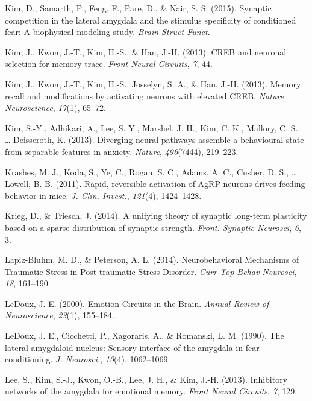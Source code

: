 \documentclass[12pt,a4paperpaper,]{report}
\begin{document}
\hypertarget{ref-kimux5fsynapticux5f2015}{}
Kim, D., Samarth, P., Feng, F., Pare, D., \& Nair, S. S. (2015).
Synaptic competition in the lateral amygdala and the stimulus
specificity of conditioned fear: A biophysical modeling study.
\emph{Brain Struct Funct}.

\hypertarget{ref-kimux5fcrebux5f2013}{}
Kim, J., Kwon, J.-T., Kim, H.-S., \& Han, J.-H. (2013). CREB and
neuronal selection for memory trace. \emph{Front Neural Circuits},
\emph{7}, 44.

\hypertarget{ref-kimux5fmemoryux5f2013}{}
Kim, J., Kwon, J.-T., Kim, H.-S., Josselyn, S. A., \& Han, J.-H. (2013).
Memory recall and modifications by activating neurons with elevated
CREB. \emph{Nature Neuroscience}, \emph{17}(1), 65--72.

\hypertarget{ref-kimux5fdivergingux5f2013-1}{}
Kim, S.-Y., Adhikari, A., Lee, S. Y., Marshel, J. H., Kim, C. K.,
Mallory, C. S., \ldots{} Deisseroth, K. (2013). Diverging neural
pathways assemble a behavioural state from separable features in
anxiety. \emph{Nature}, \emph{496}(7444), 219--223.

\hypertarget{ref-krashesux5frapidux5f2011}{}
Krashes, M. J., Koda, S., Ye, C., Rogan, S. C., Adams, A. C., Cusher, D.
S., \ldots{} Lowell, B. B. (2011). Rapid, reversible activation of AgRP
neurons drives feeding behavior in mice. \emph{J. Clin. Invest.},
\emph{121}(4), 1424--1428.

\hypertarget{ref-kriegux5funifyingux5f2014-1}{}
Krieg, D., \& Triesch, J. (2014). A unifying theory of synaptic
long-term plasticity based on a sparse distribution of synaptic
strength. \emph{Front. Synaptic Neurosci}, \emph{6}, 3.

\hypertarget{ref-lapiz-bluhmux5fneurobehavioralux5f2014}{}
Lapiz-Bluhm, M. D., \& Peterson, A. L. (2014). Neurobehavioral
Mechanisms of Traumatic Stress in Post-traumatic Stress Disorder.
\emph{Curr Top Behav Neurosci}, \emph{18}, 161--190.

\hypertarget{ref-ledouxux5femotionux5f2000-1}{}
LeDoux, J. E. (2000). Emotion Circuits in the Brain. \emph{Annual Review
of Neuroscience}, \emph{23}(1), 155--184.

\hypertarget{ref-ledouxux5flateralux5f1990}{}
LeDoux, J. E., Cicchetti, P., Xagoraris, A., \& Romanski, L. M. (1990).
The lateral amygdaloid nucleus: Sensory interface of the amygdala in
fear conditioning. \emph{J. Neurosci.}, \emph{10}(4), 1062--1069.

\hypertarget{ref-leeux5finhibitoryux5f2013}{}
Lee, S., Kim, S.-J., Kwon, O.-B., Lee, J. H., \& Kim, J.-H. (2013).
Inhibitory networks of the amygdala for emotional memory. \emph{Front
Neural Circuits}, \emph{7}, 129.
\end{document}
